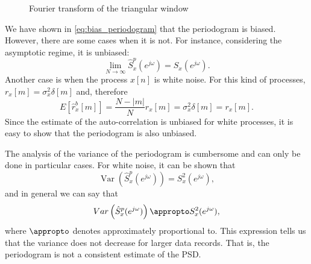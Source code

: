 \begin{figure}
	\begin{center}
	\end{center}
	\caption{Fourier transform of the triangular window}
	\label{fig:FT_triangularwindow}
\end{figure}

We have shown in \eqref{eq:bias_periodogram} that the periodogram is biased. However, there are some cases when it is not. For instance, considering the asymptotic regime, it is unbiased:
\begin{equation}
\lim_{N \rightarrow \infty} \hat{S}_x^{p}(e^{j \omega}) = S_x(e^{j \omega}).
\end{equation}
Another case is when the process $x[n]$ is white noise. For this kind of processes, $r_{x}[m] = \sigma^2_x \delta[m]$ and, therefore
\begin{equation}
E\left[\hat{r}_{x}^{b}[m]\right]  = \frac{N - |m|}{N} r_{x}[m] = \sigma^2_x \delta[m] = r_{x}[m].
\end{equation}
Since the estimate of the auto-correlation is unbiased for white processes, it is easy to show that the periodogram is also unbiased.

The analysis of the variance of the periodogram is cumbersome and can only be done in particular cases. For white noise, it can be shown that
\begin{equation}
 \mathop{Var}\left(\hat{S}_x^{p}(e^{j \omega})\right) = S_x^{2}(e^{j \omega}),
\end{equation}
and in general we can say that
\begin{equation}
\mathop{Var}\left(\hat{S}_x^{p}(e^{j \omega})\right) \appropto S_x^{2}(e^{j \omega}),
\end{equation}
where $\appropto$ denotes approximately proportional to.  This expression tells us that the variance does not decrease for larger data records. That is, the periodogram is not a consistent estimate of the PSD.

